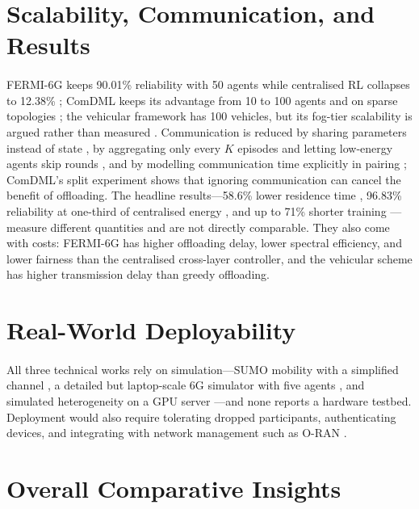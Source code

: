 \documentclass[12pt,a4paper,final]{extreport}
\begin{document}
\section{Scalability, Communication, and Results}

\paragraph{} FERMI-6G keeps 90.01\% reliability with 50 agents while centralised RL collapses to 12.38\% \cite{p2}; ComDML keeps its advantage from 10 to 100 agents and on sparse topologies \cite{p4}; the vehicular framework has 100 vehicles, but its fog-tier scalability is argued rather than measured \cite{p1}. Communication is reduced by sharing parameters instead of state \cite{p1}, by aggregating only every $K$ episodes and letting low-energy agents skip rounds \cite{p2}, and by modelling communication time explicitly in pairing \cite{p4}; ComDML's split experiment shows that ignoring communication can cancel the benefit of offloading. The headline results---58.6\% lower residence time \cite{p1}, 96.83\% reliability at one-third of centralised energy \cite{p2}, and up to 71\% shorter training \cite{p4}---measure different quantities and are not directly comparable. They also come with costs: FERMI-6G has higher offloading delay, lower spectral efficiency, and lower fairness than the centralised cross-layer controller, and the vehicular scheme has higher transmission delay than greedy offloading.

\section{Real-World Deployability}

\paragraph{} All three technical works rely on simulation---SUMO mobility with a simplified channel \cite{p1}, a detailed but laptop-scale 6G simulator with five agents \cite{p2}, and simulated heterogeneity on a GPU server \cite{p4}---and none reports a hardware testbed. Deployment would also require tolerating dropped participants, authenticating devices, and integrating with network management such as O-RAN \cite{p3}.

\section{Overall Comparative Insights}
\end{document}

